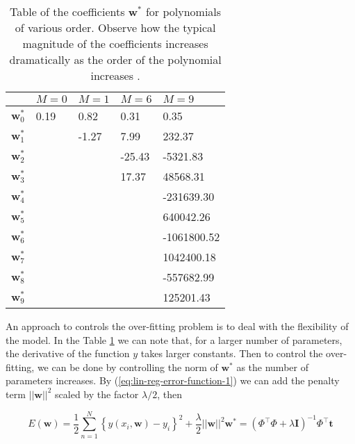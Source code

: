 \documentclass[11pt]{article} %
\begin{document}
\begin{table}[htpb]
   \centering
   \begin{tabular}{l| l l l l}
     & $M=0$ & $M=1$ & $M=6$ & $M=9$ \\
   \hline
   $\mathbf{w}_0^*$ & 0.19 & 0.82   & 0.31   & 0.35\\
   $\mathbf{w}_1^*$ &      & -1.27  & 7.99   & 232.37\\
   $\mathbf{w}_2^*$ &      &        & -25.43 & -5321.83\\
   $\mathbf{w}_3^*$ &      &        & 17.37  & 48568.31\\
   $\mathbf{w}_4^*$ &      &        &        & -231639.30\\
   $\mathbf{w}_5^*$ &      &        &        & 640042.26\\
   $\mathbf{w}_6^*$ &      &        &        & -1061800.52\\
   $\mathbf{w}_7^*$ &      &        &        & 1042400.18\\
   $\mathbf{w}_8^*$ &      &        &        & -557682.99\\
   $\mathbf{w}_9^*$ &      &        &        & 125201.43\\
   \end{tabular}
   \caption{Table of the coefficients $\mathbf{w} ^*$ for polynomials of various order. Observe how the typical magnitude of the coefficients increases dramatically as the order of the polynomial increases \cite{Bishop:2006:PRM:1162264}.}
   \label{tab:reg-lin-reg-weights}
   \end{table}

An approach to controls the over-fitting problem is to deal with the flexibility of the model. In the Table \ref{tab:reg-lin-reg-weights} we can note that, for a larger number of parameters, the derivative of the function $y$ takes larger constants. Then to control the over-fitting, we can be done by controlling the norm of $\mathbf{w}^*$ as the number of parameters increases. By (\ref{eq:lin-reg-error-function-1}) we can add the penalty term $||\mathbf{w}||^2 $ scaled by the factor $\lambda / 2$, then


\begin{subequations}
   \begin{equation}
      \label{eq:lin-reg-error-function-regularized}
      E(\mathbf{w}) = \frac{1}{2} \sum_{n=1}^N \left\{ y(x_i,\mathbf{w})-y_i \right\}^2 + \frac{\lambda}{2} ||\mathbf{w}||^2
   \end{equation}
   \begin{equation}
      \label{eq:lin-reg-error-function-regularized-matrix-form}
      \mathbf{w}^{*} = (\Phi^\top \Phi + \lambda \mathbf{I})^{-1}\Phi^\top \mathbf{t} 
   \end{equation}
\end{subequations}
\end{document}
